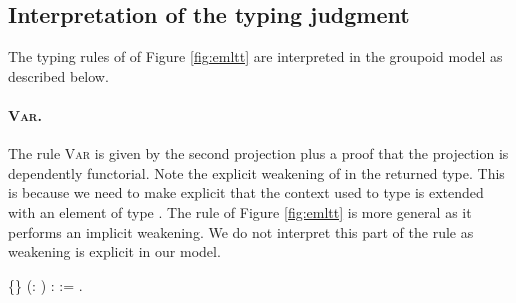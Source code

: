 \subsection{Interpretation of the typing judgment}


  \label{sec:interp}


  The typing rules of \TTu\xspace of Figure \ref{fig:emltt} are
  interpreted in the groupoid model as described below.


  \paragraph{\textsc{Var}.} 


  The rule \textsc{Var} is given by the second projection plus a proof
  that the projection is dependently functorial. Note the explicit
  weakening of  in the returned type. This is because we need to
  make explicit that the context used to type  is extended with an
  element of type . The rule of Figure \ref{fig:emltt} is more general 
  as it performs an implicit weakening. We do not interpret this part of 
  the rule as weakening is explicit in our model. 


\begin{coqdoccode}
\coqdocemptyline
\coqdocnoindent
{}  \{\} (: ) :   := \coqdocnotation{(}   \coqdocnotation{;}  \coqdocnotation{)}.\coqdoceol
\coqdocemptyline
\coqdocemptyline
\end{coqdoccode}
